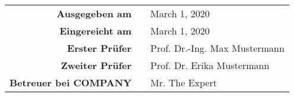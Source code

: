 \begin{titlepage}
\begin{center}
\begin{tabular}{r@{:}ll}
			\textbf{Ausgegeben am}	& & March 1, 2020	\\ [1em] %
			\textbf{Eingereicht am}	& & March 1, 2020	\\ [3em] %
			
			\textbf{Erster Prüfer} &	& Prof. Dr.-Ing. Max Mustermann	\\ [1em]
			\textbf{Zweiter Prüfer} 	& & Prof. Dr. Erika Mustermann	\\[3em]
			
			\textbf{Betreuer bei COMPANY} &	& Mr. The Expert \\ %
		\end{tabular}
	\end{center}
	
\end{titlepage}

\restoregeometry